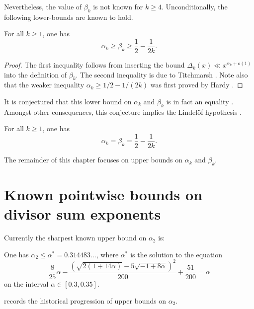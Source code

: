 Nevertheless, the value of $\beta_k$ is not known for $k \ge 4$. Unconditionally, the following lower-bounds are known to hold.

\begin{lemma}\label{divisor-lower}
For all $k \geq 1$, one has
\[
\alpha_k \geq \beta_k \geq \frac{1}{2} - \frac{1}{2k}.
\]
\end{lemma}
\begin{proof}The first inequality follows from inserting the bound $\Delta_k(x) \ll x^{\alpha_k + o(1)}$ into the definition of $\beta_k$. The second inequality is due to Titchmarsh \cite{titchmarsh_divisor_1938}. Note also that the weaker inequality $\alpha_k \ge 1/2 - 1/(2k)$ was first proved by Hardy \cite{hardy_divisor_1916}.
\end{proof}

It is conjectured that this lower bound on $\alpha_k$ and $\beta_k$ is in fact an equality \cite[p.\ 320]{titchmarsh_theory_1986}. Amongst other consequences, this conjecture implies the Lindel\"of hypothesis \cite[Chapter XII]{titchmarsh_theory_1986}.
\begin{conjecture}
For all $k \geq 1$, one has
\[
\alpha_k = \beta_k = \frac{1}{2} - \frac{1}{2k}.
\]
\end{conjecture}

The remainder of this chapter focuses on upper bounds on $\alpha_k$ and $\beta_k$.

\section{Known pointwise bounds on divisor sum exponents}

Currently the sharpest known upper bound on $\alpha_2$ is:

\begin{theorem}\label{divisor-2-bound}\cite[Theorem 1.2]{li_yang_gauss_2024} One has $\alpha_2 \leq \alpha^* = 0.314483\ldots$, where $\alpha^*$ is the solution to the equation
\[
\frac{8}{25}\alpha - \frac{(\sqrt{2(1+14\alpha)} - 5\sqrt{-1+8\alpha})^2}{200} + \frac{51}{200} = \alpha
\]
on the interval $\alpha \in [0.3, 0.35]$.
\end{theorem}

 records the historical progression of upper bounds on $\alpha_2$.

